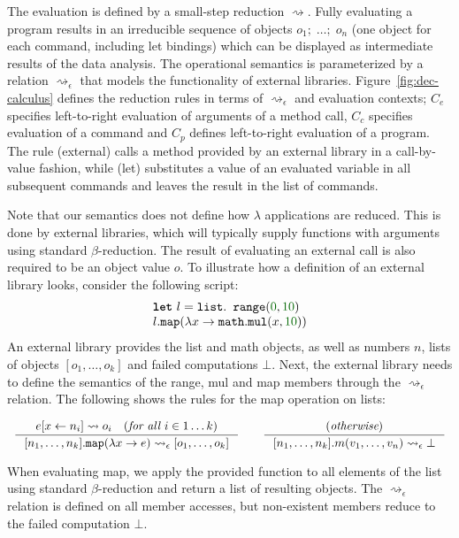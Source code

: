 \documentclass[fleqn,11pt]{report}
\newcommand{\kvd}[1]{\textnormal{\ttfamily\bfseries #1}}
\newcommand{\ident}[1]{\textnormal{\ttfamily #1}}
\newcommand{\Num}[1]{\textcolor{numclr}{#1}}
\theoremstyle{definition}
\begin{document}
The evaluation is defined by a small-step reduction $\rightsquigarrow$.
Fully evaluating a program results in an irreducible sequence of
objects $o_1;\; \ldots;\; o_n$ (one object for each command, including let bindings) which can be
displayed as intermediate results of the data analysis. The operational semantics is parameterized
by a relation $\rightsquigarrow_\epsilon$ that models the functionality of external libraries.
Figure~\ref{fig:dec-calculus} defines the reduction rules in terms of $\rightsquigarrow_\epsilon$
and evaluation contexts; $C_e$ specifies left-to-right evaluation of arguments of a method call,
$C_c$ specifies evaluation of a command and $C_p$ defines left-to-right evaluation of a program.
The rule (external) calls a method provided by an external library in a
call-by-value fashion, while (let) substitutes a value of an evaluated variable in
all subsequent commands and leaves the result in the list of commands.

Note that our semantics does not define how $\lambda$ applications are reduced. This is done by
external libraries, which will typically supply functions with arguments using standard $\beta$-reduction.
The result of evaluating an external call is also required to be an object value $o$.
To illustrate how a definition of an external library looks, consider the following script:
%
\begin{equation*}
\begin{array}{l}
\kvd{let}~l = \ident{list}.\ident{range}(\Num{0}, \Num{10})\\
l.\ident{map}(\lambda x \rightarrow \ident{math}.\ident{mul}(x, \Num{10}))
\end{array}
\end{equation*}
%
An external library provides the \ident{list} and \ident{math} objects, as well as
numbers $n$, lists of objects $[o_1, \ldots, o_k]$ and failed computations $\bot$.
Next, the external library needs to define the semantics of the \ident{range}, \ident{mul} and
\ident{map} members through the $\rightsquigarrow_\epsilon$ relation. The following shows
the rules for the \ident{map} operation on lists:
%
\begin{equation*}
\begin{array}{l}
\\[-0.75em]
\inference
  {e[x \leftarrow n_i] \rightsquigarrow o_i \quad (\textit{for all $i\in 1\ldots k$})}
  {[ n_1, \ldots, n_k ].\ident{map}(\lambda x\rightarrow e) \rightsquigarrow_\epsilon [ o_1, \ldots, o_k ]}
\qquad
\inference
  {(\textit{otherwise})}
  {[ n_1, \ldots, n_k ].m(v_1, \ldots, v_n) \rightsquigarrow_\epsilon \bot}
\\[-0.75em]
~
\end{array}
\end{equation*}
%
When evaluating \ident{map}, we apply the provided function to all elements of the list using
standard $\beta$-reduction and return a list of resulting objects. The $\rightsquigarrow_\epsilon$
relation is defined on all member accesses, but non-existent members reduce to the failed
computation $\bot$.
\end{document}
